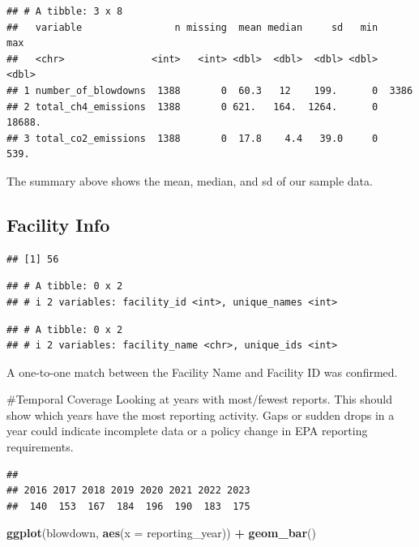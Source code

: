 \documentclass[
]{article}
\newenvironment{Shaded}{\begin{snugshade}}{\end{snugshade}}
\newcommand{\AttributeTok}[1]{\textcolor[rgb]{0.13,0.29,0.53}{#1}}
\newcommand{\FunctionTok}[1]{\textcolor[rgb]{0.13,0.29,0.53}{\textbf{#1}}}
\newcommand{\NormalTok}[1]{#1}
\newcommand{\SpecialCharTok}[1]{\textcolor[rgb]{0.81,0.36,0.00}{\textbf{#1}}}
\begin{document}
\begin{verbatim}
## # A tibble: 3 x 8
##   variable                n missing  mean median     sd   min    max
##   <chr>               <int>   <int> <dbl>  <dbl>  <dbl> <dbl>  <dbl>
## 1 number_of_blowdowns  1388       0  60.3   12    199.      0  3386 
## 2 total_ch4_emissions  1388       0 621.   164.  1264.      0 18688.
## 3 total_co2_emissions  1388       0  17.8    4.4   39.0     0   539.
\end{verbatim}

The summary above shows the mean, median, and sd of our sample data.

\subsection{Facility Info}\label{facility-info}

\begin{verbatim}
## [1] 56
\end{verbatim}

\begin{verbatim}
## # A tibble: 0 x 2
## # i 2 variables: facility_id <int>, unique_names <int>
\end{verbatim}

\begin{verbatim}
## # A tibble: 0 x 2
## # i 2 variables: facility_name <chr>, unique_ids <int>
\end{verbatim}

A one-to-one match between the Facility Name and Facility ID was
confirmed.

\#Temporal Coverage Looking at years with most/fewest reports. This
should show which years have the most reporting activity. Gaps or sudden
drops in a year could indicate incomplete data or a policy change in EPA
reporting requirements.

\begin{Shaded}
\end{Shaded}

\begin{verbatim}
## 
## 2016 2017 2018 2019 2020 2021 2022 2023 
##  140  153  167  184  196  190  183  175
\end{verbatim}

\begin{Shaded}
\begin{Highlighting}[]
\FunctionTok{ggplot}\NormalTok{(blowdown, }\FunctionTok{aes}\NormalTok{(}\AttributeTok{x =}\NormalTok{ reporting\_year)) }\SpecialCharTok{+} \FunctionTok{geom\_bar}\NormalTok{()}
\end{Highlighting}
\end{Shaded}
\end{document}
